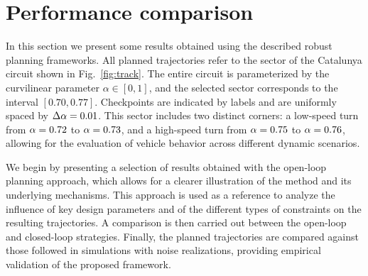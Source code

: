 \section{Performance comparison}
\label{sec:performance_comparison}

In this section we present some results obtained using the described robust planning frameworks. All planned trajectories refer to the sector of the Catalunya circuit shown in Fig.~\ref{fig:track}.
The entire circuit is parameterized by the curvilinear parameter $\alpha \in [0,1]$, and the selected sector corresponds to the interval $\left[0.70, 0.77\right]$. Checkpoints are indicated by labels and are uniformly spaced by $\Delta\alpha=0.01$. This sector includes two distinct corners: a low-speed turn from $\alpha = 0.72$ to $\alpha = 0.73$, and a high-speed turn from $\alpha = 0.75$ to $\alpha = 0.76$, allowing for the evaluation of vehicle behavior across different dynamic scenarios.

We begin by presenting a selection of results obtained with the open-loop planning approach, which allows for a clearer illustration of the method and its underlying mechanisms. This approach is used as a reference to analyze the influence of key design parameters and of the different types of constraints on the resulting trajectories. A comparison is then carried out between the open-loop and closed-loop strategies. Finally, the planned trajectories are compared against those followed in simulations with noise realizations, providing empirical validation of the proposed framework.


